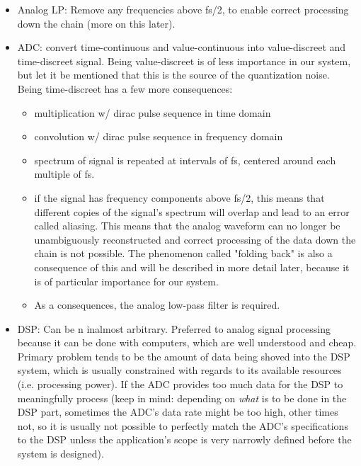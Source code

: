 \begin{itemize}\tightlist
    \item
        Analog LP: Remove any frequencies above fs/2, to enable correct processing
        down the chain (more on this later).
    \item
        ADC: convert time-continuous and value-continuous into value-discreet and
        time-discreet signal. Being value-discreet is of less importance in our
        system, but let it be mentioned that this is the source of the quantization
        noise. Being time-discreet has a few more consequences:
        \begin{itemize}\tightlist
                \item
                    multiplication w/ dirac pulse sequence in time domain
                \item
                    convolution w/ dirac pulse sequence in frequency domain
                \item
                    spectrum of signal is repeated at intervals of fs, centered
                    around each multiple of fs.
                \item
                    if the signal has frequency components above fs/2, this means
                    that different copies of the signal's spectrum will overlap
                    and lead to an error called aliasing. This means that the
                    analog waveform can no longer be unambiguously reconstructed
                    and correct processing of the data down the chain is not possible.
                    The phenomenon called "folding back" is also a consequence of
                    this and will be described in more detail later, because it is
                    of particular importance for our system.
                \item
                    As a consequences, the analog low-pass filter is required.
        \end{itemize}
    \item
        DSP: Can be n inalmost arbitrary. Preferred to analog signal processing because
        it can be done with computers, which are well understood and cheap.
        Primary problem tends to be the amount of data being shoved into the DSP
        system, which is usually constrained with regards to its available resources
        (i.e. processing power). If the ADC provides too much data for the DSP to
        meaningfully process (keep in mind: depending on \emph{what} is to be done
        in the DSP part, sometimes the ADC's data rate might be too high, other times
        not, so it is usually not possible to perfectly match the ADC's specifications
        to the DSP unless the application's scope is very narrowly defined before the
        system is designed).
\end{itemize}

